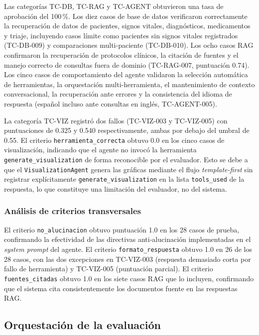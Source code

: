 Las categorías TC-DB, TC-RAG y TC-AGENT obtuvieron una tasa de aprobación
del 100\,\%. Los diez casos de base de datos verificaron correctamente la
recuperación de datos de pacientes, signos vitales, diagnósticos, medicamentos
y triaje, incluyendo casos límite como pacientes sin signos vitales registrados
(TC-DB-009) y comparaciones multi-paciente (TC-DB-010). Los ocho casos RAG
confirmaron la recuperación de protocolos clínicos, la citación de fuentes y
el manejo correcto de consultas fuera de dominio (TC-RAG-007, puntuación 0.74).
Los cinco casos de comportamiento del agente validaron la selección automática
de herramientas, la orquestación multi-herramienta, el mantenimiento de
contexto conversacional, la recuperación ante errores y la consistencia del
idioma de respuesta (español incluso ante consultas en inglés, TC-AGENT-005).

La categoría TC-VIZ registró dos fallos (TC-VIZ-003 y TC-VIZ-005) con
puntuaciones de 0.325 y 0.540 respectivamente, ambas por debajo del umbral
de 0.55. El criterio \texttt{herramienta\_correcta} obtuvo 0.0 en los cinco
casos de visualización, indicando que el agente no invocó la herramienta
\texttt{generate\_visualization} de forma reconocible por el evaluador.
Esto se debe a que el \texttt{VisualizationAgent} genera las gráficas
mediante el flujo \textit{template-first} sin registrar explícitamente
\texttt{generate\_visualization} en la lista \texttt{tools\_used} de la
respuesta, lo que constituye una limitación del evaluador, no del sistema.

\subsubsection{Análisis de criterios transversales}
\label{sec:criterios_transversales}

El criterio \texttt{no\_alucinacion} obtuvo puntuación 1.0 en los 28 casos
de prueba, confirmando la efectividad de las directivas anti-alucinación
implementadas en el \textit{system prompt} del agente. El criterio
\texttt{formato\_respuesta} obtuvo 1.0 en 26 de los 28 casos, con las dos
excepciones en TC-VIZ-003 (respuesta demasiado corta por fallo de herramienta)
y TC-VIZ-005 (puntuación parcial). El criterio \texttt{fuentes\_citadas}
obtuvo 1.0 en los siete casos RAG que lo incluyen, confirmando que el sistema
cita consistentemente los documentos fuente en las respuestas RAG.

\subsection{Orquestación de la evaluación}
\label{sec:eval_orquestacion}

